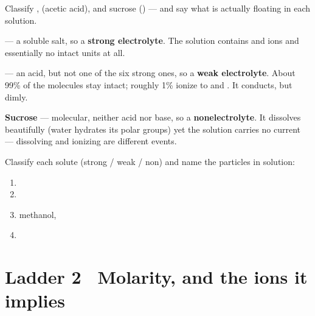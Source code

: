 \documentclass{apchem-worksheet}
\begin{document}
\begin{workedexample}
Classify ,  (acetic acid), and sucrose
() --- and say what is actually floating in each solution.

\textbf{} --- a soluble salt, so a \textbf{strong electrolyte}.
The solution contains  and  ions and essentially no
intact  units at all.

\textbf{} --- an acid, but not one of the six strong ones, so
a \textbf{weak electrolyte}. About 99\% of the molecules stay intact;
roughly 1\% ionize to  and . It conducts, but dimly.

\textbf{Sucrose} --- molecular, neither acid nor base, so a
\textbf{nonelectrolyte}. It dissolves beautifully (water hydrates its
polar  groups) yet the solution carries no current --- dissolving
and ionizing are different events.
\end{workedexample}

\begin{yourturn}
Classify each solute (strong / weak / non) and name the particles in
solution:
\begin{enumerate}[leftmargin=*,itemsep=0.5em]
  \item {} \workspace[1.2cm]
  \item {} \workspace[1.2cm]
  \item methanol,  \workspace[1.2cm]
  \item {} \workspace[1.2cm]
\end{enumerate}
\end{yourturn}

\section*{\sffamily Ladder 2 \textbullet\ Molarity, and the ions it
implies}
\end{document}
